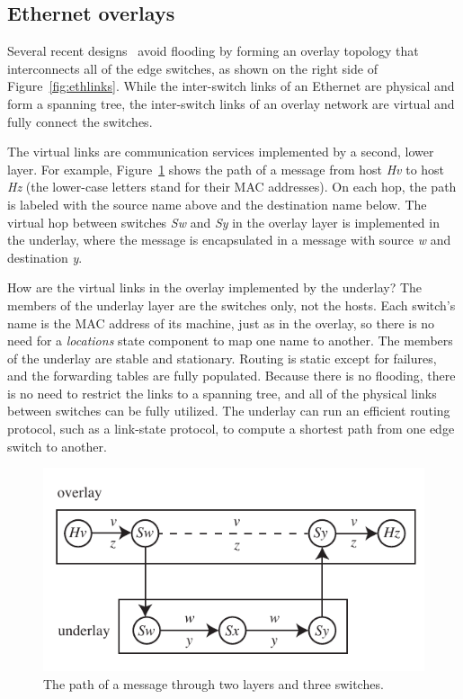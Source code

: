 \subsection{Ethernet overlays}

Several recent
designs~\cite{seattle,vl2,nvp} avoid flooding by forming
an overlay topology that interconnects all of the edge switches, as
shown on the right side of Figure~\ref{fig:ethlinks}.  While the
inter-switch links of an Ethernet are physical and form a spanning
tree, the inter-switch links of an overlay network are virtual and
fully connect the switches.  

The virtual links are communication services implemented by a second,
lower layer.  For example, Figure~\ref{fig:seattle} shows the path of
a message from host {\it Hv} to host {\it Hz} (the lower-case letters
stand for their MAC addresses).  On each hop, the path is labeled with
the source name above and the destination name below.  The virtual hop
between switches {\it Sw} and {\it Sy} in the overlay layer is
implemented in the underlay, where the message is encapsulated in a
message with source {\it w} and destination {\it y}.

How are the virtual links in the overlay implemented by the underlay?
The members of the underlay layer are the switches
only, not the hosts.  Each switch's name is the MAC address of its
machine, just as in the overlay, so there is no need for a 
{\it locations} state component to map one name to another.  
The members of the underlay are stable and
stationary.  Routing is static except for failures, and the forwarding
tables are fully populated.  Because there is no flooding, there is no
need to restrict the links to a spanning tree, and all of the physical
links between switches can be fully utilized.  
The underlay can run an efficient routing protocol, such as a link-state
protocol, to compute a shortest path from one edge switch to
another.

\begin{figure}
\centering
\includegraphics[scale=1.00]{figures/seattle.pdf}
\caption{The path of a message through two layers and three
switches.}
\label{fig:seattle}
\end{figure}

